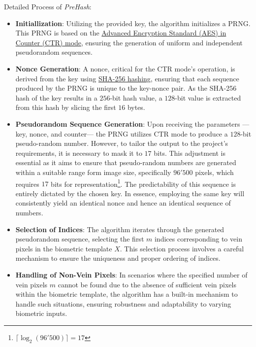 Detailed Process of \textit{PreHash}:
\begin{itemize}
    \item \textbf{Initiallization}: Utilizing the provided key, the algorithm initializes a PRNG. This PRNG is based on the \hyperref[def:AES CTR mode]{Advanced Encryption Standard (AES) in Counter (CTR) mode}, ensuring the generation of uniform and independent pseudorandom sequences.

    \item \textbf{Nonce Generation}: A nonce, critical for the CTR mode's operation, is derived from the key using \hyperref[def:SHA-256]{SHA-256 hashing}, ensuring that each sequence produced by the PRNG is unique to the key-nonce pair. As the SHA-256 hash of the key results in a \(256\)-bit hash value, a \(128\)-bit value is extracted from this hash by slicing the first \(16\) bytes.

    \item \textbf{Pseudorandom Sequence Generation}: Upon receiving the parameters —key, nonce, and counter— the PRNG utilizes CTR mode to produce a \(128\)-bit pseudo-random number. However, to tailor the output to the project's requirements, it is necessary to mask it to \(17\) bits. This adjustment is essential as it aims to ensure that pseudo-random numbers are generated within a suitable range form image size, specifically \(96'500\) pixels, which requires \(17\) bits for representation\footnote{\(\lceil \log_2(96'500) \rceil = 17\)}. The predictability of this sequence is entirely dictated by the chosen key. In essence, employing the same key will consistently yield an identical nonce and hence an identical sequence of numbers.

    \item \textbf{Selection of Indices}: The algorithm iterates through the generated pseudorandom sequence, selecting the first \(m\) indices corresponding to vein pixels in the biometric template \(X\). This selection process involves a careful mechanism to ensure the uniqueness and proper ordering of indices.

    \item \textbf{Handling of Non-Vein Pixels}: In scenarios where the specified number of vein pixels \(m\) cannot be found due to the absence of sufficient vein pixels within the biometric template, the algorithm has a built-in mechanism to handle such situations, ensuring robustness and adaptability to varying biometric inputs.

\end{itemize}

